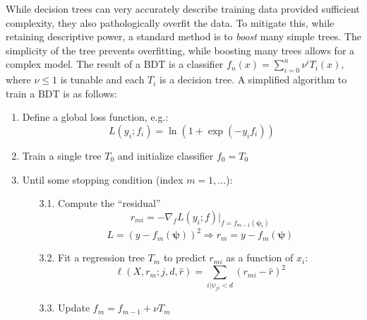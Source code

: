 While decision trees can very accurately describe training data provided sufficient complexity, they also pathologically overfit the data.
To mitigate this, while retaining descriptive power, a standard method is to \emph{boost} many simple trees.
The simplicity of the tree prevents overfitting, while boosting many trees allows for a complex model.
The result of a BDT is a classifier $f_n(x) = \sum_{i=0}^n \nu^i T_i(x)$, where $\nu\leq 1$ is tunable and each $T_i$ is a decision tree. 
A simplified algorithm to train a BDT is as follows:
\begin{enumerate}
    \item Define a global loss function, e.g.:
        \begin{equation} L(y_i; f_i) = \ln\left(1 + \exp(-y_if_i)\right)\end{equation}
    \item Train a single tree $T_0$ and initialize classifier $f_0 = T_0$
    \item Until some stopping condition (index $m=1,\dots$):
    \begin{enumerate}
      \item[3.1.] Compute the ``residual''
        \begin{equation}r_{mi} = -\nabla_f L(y_i; f) |_{f=f_{m-1}(\bm\psi_i)}\end{equation}
        \begin{equation}L = (y-f_m(\bm\psi))^2 \Rightarrow r_m = y - f_m(\bm\psi) \end{equation}
      \item[3.2.] Fit a regression tree $T_m$ to predict $r_{mi}$ as a function of $x_i$:
        \begin{equation}\ell(X,r_m;j,d,\hat{r}) = \sum_{i | \psi_{ji} < d} (r_{mi} - \hat r)^2\end{equation}
      \item[3.3.] Update $f_m = f_{m-1} + \nu T_m$
    \end{enumerate}
\end{enumerate}

